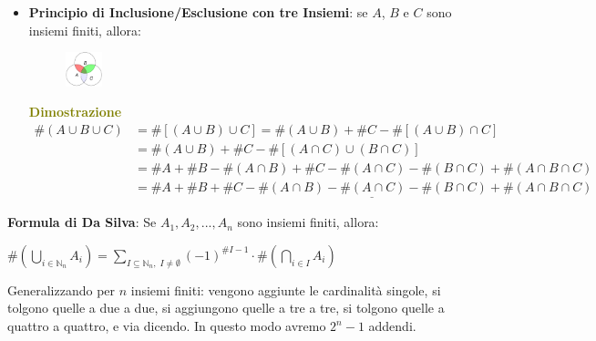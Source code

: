 \begin{itemize}[nosep]
    \newpage
    \item \textbf{Principio di Inclusione/Esclusione con tre Insiemi}: se $A$, $B$ e $C$ sono insiemi finiti, allora: 

    \begin{figure}[h]
        \centering
        \includegraphics[width=0.1\textwidth]{img/inc_escl_2}
    \end{figure}
    \begin{boxA}
        \textcolor{olive}{\textbf{Dimostrazione}}
        \begin{align*}
            \# (A \cup B \cup C) &= \# [(A \cup B) \cup C] = \# (A \cup B) + \# C - \# [(A \cup B) \cap C] \\
            &= \# (A \cup B) + \# C - \# [(A \cap C) \cup (B \cap C)] \\
            &= \# A + \# B - \# (A \cap B) + \# C - \# (A \cap C) - \# (B \cap C) + \# (A \cap B \cap C) \\
            &= \underline{\# A + \# B + \# C - \# (A \cap B) - \# (A \cap C) - \# (B \cap C) + \# (A \cap B \cap C)}
        \end{align*}
    \end{boxA}
\end{itemize}

\begin{flushleft}
    \textbf{Formula di Da Silva}: Se $A_1, A_2, ..., A_n$ sono insiemi finiti, allora:

    {\centering
        $\# (\underset{i \in \mathbb{N}_n}{\bigcup} A_i) = \underset{I \subseteq \mathbb{N}_n, \; I \neq \emptyset}{\sum} (-1)^{\# I - 1} \cdot \# (\underset{i \in I}{\bigcap} A_i)$
    \par}
    Generalizzando per $n$ insiemi finiti: vengono aggiunte le cardinalità singole, si tolgono quelle a due a due, si aggiungono quelle a tre a tre, si tolgono quelle a quattro a quattro, e via dicendo. In questo modo avremo $2^n - 1$ addendi.
\end{flushleft}